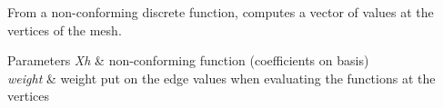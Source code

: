 From a non-\/conforming discrete function, computes a vector of values at the vertices of the mesh. 


\begin{DoxyParams}{Parameters}
{\em Xh} & non-\/conforming function (coefficients on basis) \\
\hline
{\em weight} & weight put on the edge values when evaluating the functions at the vertices \\
\hline
\end{DoxyParams}
